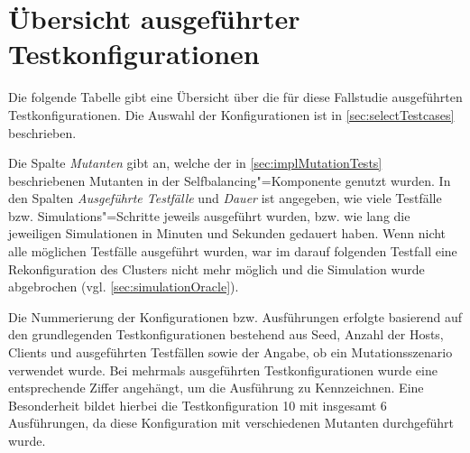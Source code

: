 \chapter{Übersicht ausgeführter Testkonfigurationen}
\label{app:overviewExecutedTestCases}

Die folgende Tabelle gibt eine Übersicht über die für diese Fallstudie ausgeführten Testkonfigurationen.
Die Auswahl der Konfigurationen ist in \autoref{sec:selectTestcases} beschrieben.

Die Spalte \emph{Mutanten} gibt an, welche der in \autoref{sec:implMutationTests} beschriebenen Mutanten in der Selfbalancing"=Komponente genutzt wurden.
In den Spalten \emph{Ausgeführte Testfälle} und \emph{Dauer} ist angegeben, wie viele Testfälle bzw. Simulations"=Schritte jeweils ausgeführt wurden, bzw. wie lang die jeweiligen Simulationen in Minuten und Sekunden gedauert haben.
Wenn nicht alle möglichen Testfälle ausgeführt wurden, war im darauf folgenden Testfall eine Rekonfiguration des Clusters nicht mehr möglich und die Simulation wurde abgebrochen (vgl. \autoref{sec:simulationOracle}).

Die Nummerierung der Konfigurationen bzw. Ausführungen erfolgte basierend auf den grundlegenden Testkonfigurationen bestehend aus Seed, Anzahl der Hosts, Clients und ausgeführten Testfällen sowie der Angabe, ob ein Mutationsszenario verwendet wurde.
Bei mehrmals ausgeführten Testkonfigurationen wurde eine entsprechende Ziffer angehängt, um die Ausführung zu Kennzeichnen.
Eine Besonderheit bildet hierbei die Testkonfiguration 10 mit insgesamt 6 Ausführungen, da diese Konfiguration mit verschiedenen Mutanten durchgeführt wurde.

